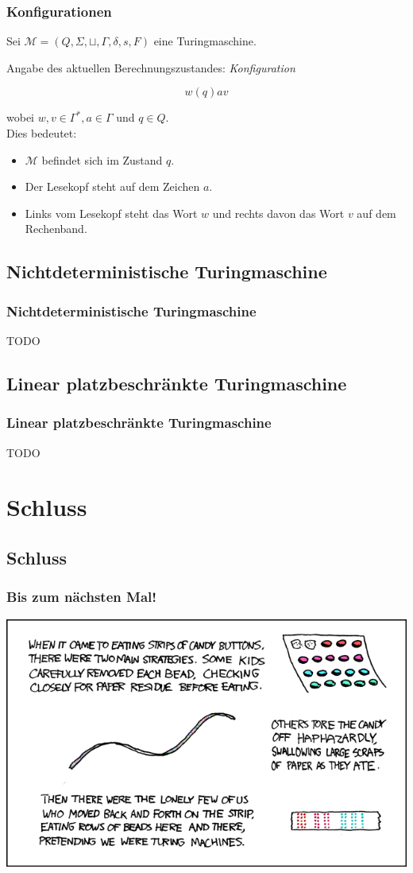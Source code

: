 \begin{frame}
\frametitle{Konfigurationen}
Sei $\mathcal{M} =(Q,\Sigma, \sqcup, \Gamma,\delta,s,F)$ eine Turingmaschine.

Angabe des aktuellen Berechnungszustandes: \emph{Konfiguration}

$$w(q)av$$ 

wobei $w,v \in \Gamma^*, a \in \Gamma$ und $q\in Q$. \\

Dies bedeutet:

\begin{itemize}
	\item $\mathcal{M}$ befindet sich im Zustand $q$.
	\item Der Lesekopf steht auf dem Zeichen $a$.
	\item Links vom Lesekopf steht das Wort $w$ und rechts davon das Wort $v$ auf dem Rechenband.
\end{itemize}
\end{frame}

\subsection{Nichtdeterministische Turingmaschine}
\begin{frame}
	\frametitle{Nichtdeterministische Turingmaschine}
	TODO
\end{frame}

\subsection{Linear platzbeschränkte Turingmaschine}
\begin{frame}
	\frametitle{Linear platzbeschränkte Turingmaschine}
	TODO
\end{frame}

\section{Schluss}
\subsection{Schluss}

\begin{frame}
\frametitle{Bis zum nächsten Mal!}
\begin{center}
  \includegraphics[width=1 \textheight]{images/xkcd_205.png}
\end{center}
\end{frame}

